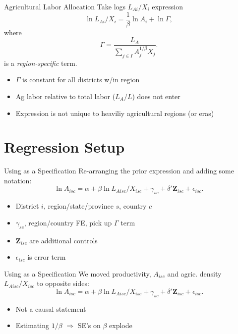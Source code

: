 \documentclass[10pt, xcolor=dvipsnames]{beamer}
\begin{document}
\begin{frame}{Agricultural Labor Allocation}\label{model}
Take logs $L_{Ai}/X_i$ expression
\begin{equation}
\ln L_{Ai}/X_i = \frac{1}{\beta} \ln A_{i} + \ln \Gamma, \label{EQ_est}
\end{equation}
where
\begin{equation}
    \Gamma = \frac{L_A}{\sum_{j\in I} A_{j}^{1/\beta}X_{j}}.
\end{equation}
is a \textit{region-specific} term. 

\begin{itemize}
  \item $\Gamma$ is constant for all districts w/in region
  \item Ag labor relative to total labor ($L_A/L$) does not enter
  \item Expression is not unique to heaviliy agricultural regions (or eras)
\end{itemize}

\hfill \hyperlink{extend}{}
\end{frame}

\section{Regression Setup}

\begin{frame}{Using as a Specification}
Re-arranging the prior expression and adding some notation:
\begin{equation}
  \ln A_{isc} = \alpha + \beta \ln L_{Aisc}/X_{isc} + \gamma_{sc} + \delta' \mathbf{Z}_{isc} + \epsilon_{isc}. \label{EQ_regress}
\end{equation}

\begin{itemize}
  \item District $i$, region/state/province $s$, country $c$
  \item $\gamma_{sc}$, region/country FE, pick up $\Gamma$ term
  \item $\mathbf{Z}_{isc}$ are additional controls
  \item $\epsilon_{isc}$ is error term
\end{itemize}
\end{frame}

\begin{frame}{Using as a Specification}
We moved productivity, $A_{isc}$ and agric. density $L_{Aisc}/X_{isc}$ to opposite sides:
\begin{equation}
  \ln A_{isc} = \alpha + \beta \ln L_{Aisc}/X_{isc} + \gamma_{sc} + \delta' \mathbf{Z}_{isc} + \epsilon_{isc}. \label{EQ_regress}
\end{equation}

\begin{itemize}
  \item Not a causal statement
  \item Estimating $1/\beta$ $\Rightarrow$ SE's on $\beta$ explode
\end{itemize}
\end{frame}
\end{document}
